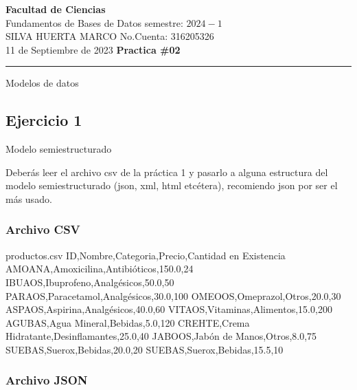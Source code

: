 \documentclass[a4paper,12pt]{article}
\begin{document}
\pagecolor{black}
\color{white}

\thispagestyle{firstpage} %
\noindent
\large\textbf{Facultad de Ciencias} \\
Fundamentos de Bases de Datos \hfill semestre: $2024-1$ \\
\textsc{SILVA HUERTA MARCO}   \hfill No.Cuenta: 316205326    \\
11 de Septiembre de 2023      \hfill \textbf{Practica \#02}    \\
\noindent\rule{7.3in}{2.8pt}

\begin{center}
\Large{Modelos de datos}
\end{center}



\subsection*{Ejercicio 1}

Modelo semiestructurado

\textcolor{sun}{Deberás leer el archivo csv de la práctica 1 y pasarlo a alguna estructura del modelo
semiestructurado (json, xml, html etcétera), recomiendo json por ser el más usado.}


\subsubsection*{Archivo CSV}

\begin{filecontents*}{productos.csv}
    ID,Nombre,Categoria,Precio,Cantidad en Existencia
    AMOANA,Amoxicilina,Antibióticos,150.0,24
    IBUAOS,Ibuprofeno,Analgésicos,50.0,50
    PARAOS,Paracetamol,Analgésicos,30.0,100
    OMEOOS,Omeprazol,Otros,20.0,30
    ASPAOS,Aspirina,Analgésicos,40.0,60
    VITAOS,Vitaminas,Alimentos,15.0,200
    AGUBAS,Agua Mineral,Bebidas,5.0,120
    CREHTE,Crema Hidratante,Desinflamantes,25.0,40
    JABOOS,Jabón de Manos,Otros,8.0,75
    SUEBAS,Suerox,Bebidas,20.0,20
    SUEBAS,Suerox,Bebidas,15.5,10
\end{filecontents*}


\subsubsection*{Archivo JSON}
\end{document}
